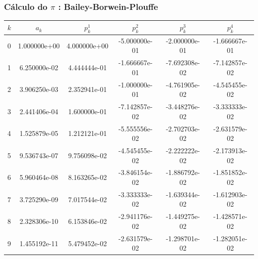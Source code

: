 \documentclass{beamer}
\newcommand\safepi[0]{
	\texorpdfstring{$\pi$}{Pi}
}
\begin{document}

\begin{frame}

\frametitle{Cálculo do \safepi: Bailey-Borwein-Plouffe}

\scriptsize
\renewcommand*{\arraystretch}{1.3}
\begin{table}[h]
	\centering
	\begin{tabular}{|l|c|c|c|c|c|}
		\hline
		$k$ & $a_k$	& $p_k^1$ & $p_k^2$ & $p_k^3$ & $p_k^4$\\ 
		\hline
		0& 1.000000e+00& 4.000000e+00& -5.000000e-01& -2.000000e-01& -1.666667e-01\\
		1& 6.250000e-02& 4.444444e-01& -1.666667e-01& -7.692308e-02& -7.142857e-02\\
		2& 3.906250e-03& 2.352941e-01& -1.000000e-01& -4.761905e-02& -4.545455e-02\\
		3& 2.441406e-04& 1.600000e-01& -7.142857e-02& -3.448276e-02& -3.333333e-02\\
		4& 1.525879e-05& 1.212121e-01& -5.555556e-02& -2.702703e-02& -2.631579e-02\\
		5& 9.536743e-07& 9.756098e-02& -4.545455e-02& -2.222222e-02& -2.173913e-02\\
		6& 5.960464e-08& 8.163265e-02& -3.846154e-02& -1.886792e-02& -1.851852e-02\\
		7& 3.725290e-09& 7.017544e-02& -3.333333e-02& -1.639344e-02& -1.612903e-02\\
		8& 2.328306e-10& 6.153846e-02& -2.941176e-02& -1.449275e-02& -1.428571e-02\\
		9& 1.455192e-11& 5.479452e-02& -2.631579e-02& -1.298701e-02& -1.282051e-02\\
		\hline
	\end{tabular}
\end{table}
\renewcommand*{\arraystretch}{1}
\normalsize
	
\end{frame}

\end{document}
